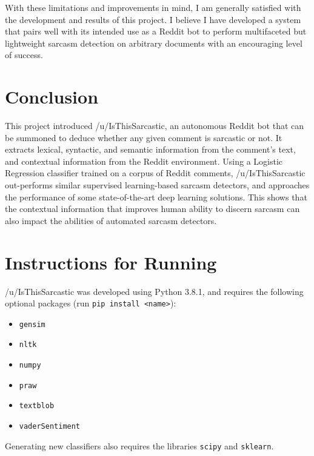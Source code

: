 \documentclass[a4paper,12pt]{article}
\begin{document}
With these limitations and improvements in mind, I am generally satisfied with the development and results of this project. I believe I have developed a system that pairs well with its intended use as a Reddit bot to perform multifaceted but lightweight sarcasm detection on arbitrary documents with an encouraging level of success.

\section{Conclusion}
This project introduced /u/IsThisSarcastic, an autonomous Reddit bot that can be summoned to deduce whether any given comment is sarcastic or not. It extracts lexical, syntactic, and semantic information from the comment's text, and contextual information from the Reddit environment. Using a Logistic Regression classifier trained on a corpus of Reddit comments, /u/IsThisSarcastic out-performs similar supervised learning-based sarcasm detectors, and approaches the performance of some state-of-the-art deep learning solutions. This shows that the contextual information that improves human ability to discern sarcasm can also impact the abilities of automated sarcasm detectors.
\clearpage

\begin{footnotesize}


\end{footnotesize}

\newpage
{}
\renewcommand*{\thepage}{A\arabic{page}}
\appendix

\section{Instructions for Running}
/u/IsThisSarcastic was developed using Python 3.8.1, and requires the following optional packages (run \texttt{pip install <name>}):
\begin{itemize}
	\item \texttt{gensim}
	\item \texttt{nltk}
	\item \texttt{numpy}
	\item \texttt{praw}
	\item \texttt{textblob}
	\item \texttt{vaderSentiment}
\end{itemize}

Generating new classifiers also requires the libraries \texttt{scipy} and \texttt{sklearn}.
\end{document}
